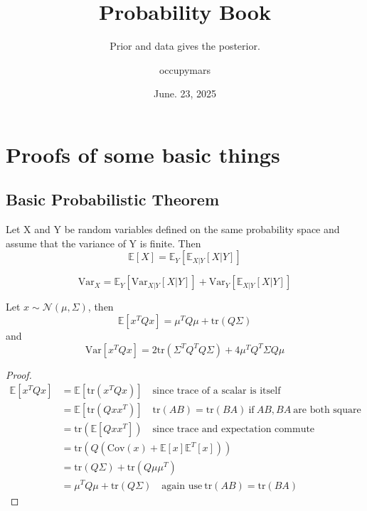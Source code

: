 \documentclass[10pt]{elegantbook}
\title{Probability Book}
\subtitle{Prior and data gives the posterior.}
\author{occupymars}
\date{June. 23, 2025}
\begin{document}
\maketitle

\frontmatter
\tableofcontents

\mainmatter

\chapter{Proofs of some basic things}

\section{Basic Probabilistic Theorem}

\begin{theorem}
    Let X and Y be random variables defined on the same probability space and assume that the variance of Y is finite. 
    Then
    \begin{equation}
        \mathbb E[X] = \mathbb E_Y \left [ \mathbb E_{X | Y} [X | Y] \right ]
    \end{equation}

    \begin{equation}
        \mathrm{Var}_X = \mathbb E_Y \left [ \mathrm{Var}_{X | Y} [X | Y] \right ] + \mathrm{Var}_Y \left [ \mathbb E_{X | Y} [X | Y] \right ]
    \end{equation}
\end{theorem}

\begin{theorem}
    Let $x \sim \mathcal N(\mu, \Sigma)$, then
    \[
        \mathbb E [x^T Q x] = \mu^T Q \mu + \mathrm{tr}(Q \Sigma)
    \]
    and
    \[
        \mathrm{Var} [x^T Q x] = 2 \mathrm{tr} (\Sigma^T Q^T Q \Sigma) + 4 \mu^T Q^T \Sigma Q \mu
    \]
\end{theorem}

\begin{proof}
    \[
        \begin{aligned}
           \mathbb E [x^T Q x] &= \mathbb E [ \mathrm{tr} (x^T Q x)] \quad \text{since trace of a scalar is itself} \\
                               &= \mathbb E [ \mathrm{tr} (Q x x^T)] \quad \mathrm{tr}(AB) = \mathrm{tr}(BA) ~ \text{if} ~ AB, BA ~ \text{are both square} \\
                               &= \mathrm{tr}(\mathbb E [ Q x x^T]) \quad \text{since trace and expectation commute} \\
                               &= \mathrm{tr}( Q(\mathrm{Cov}(x) + \mathbb E [x] \mathbb E^T [x] )) \\
                               &= \mathrm{tr} (Q \Sigma) + \mathrm{tr} (Q \mu \mu^T) \\
                               &= \mu^T Q \mu + \mathrm{tr}(Q \Sigma) \quad \text{again use} ~ \mathrm{tr}(AB) = \mathrm{tr}(BA)
        \end{aligned}
    \]
\end{proof}
\end{document}
